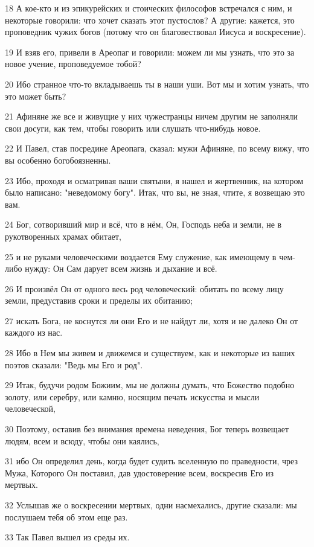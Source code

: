 18 А кое-кто и из эпикурейских и стоических философов встречался с ним, и некоторые говорили: что хочет сказать этот пустослов? А другие: кажется, это проповедник чужих богов (потому что он благовествовал Иисуса и воскресение).

19 И взяв его, привели в Ареопаг и говорили: можем ли мы узнать, что это за новое учение, проповедуемое тобой?

20 Ибо странное что-то вкладываешь ты в наши уши. Вот мы и хотим узнать, что это может быть?

21 Афиняне же все и живущие у них чужестранцы ничем другим не заполняли свои досуги, как тем, чтобы говорить или слушать что-нибудь новое.

22 И Павел, став посредине Ареопага, сказал: мужи Афиняне, по всему вижу, что вы особенно богобоязненны.

23 Ибо, проходя и осматривая ваши святыни, я нашел и жертвенник, на котором было написано: "неведомому богу". Итак, что вы, не зная, чтите, я возвещаю это вам.

24 Бог, сотворивший мир и всё, что в нём, Он, Господь неба и земли, не в рукотворенных храмах обитает,

25 и не руками человеческими воздается Ему служение, как имеющему в чем-либо нужду: Он Сам дарует всем жизнь и дыхание и всё.

26 И произвёл Он от одного весь род человеческий: обитать по всему лицу земли, предуставив сроки и пределы их обитанию;

27 искать Бога, не коснутся ли они Его и не найдут ли, хотя и не далеко Он от каждого из нас.

28 Ибо в Нем мы живем и движемся и существуем, как и некоторые из ваших поэтов сказали: "Ведь мы Его и род".

29 Итак, будучи родом Божиим, мы не должны думать, что Божество подобно золоту, или серебру, или камню, носящим печать искусства и мысли человеческой,

30 Поэтому, оставив без внимания времена неведения, Бог теперь возвещает людям, всем и всюду, чтобы они каялись,

31 ибо Он определил день, когда будет судить вселенную по праведности, чрез Мужа, Которого Он поставил, дав удостоверение всем, воскресив Его из мертвых.

32 Услышав же о воскресении мертвых, одни насмехались, другие сказали: мы послушаем тебя об этом еще раз.

33 Так Павел вышел из среды их.

